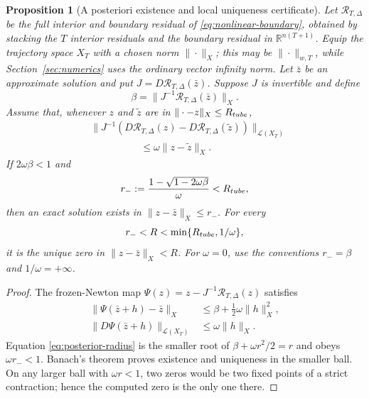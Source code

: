 \documentclass[twocolumn,nameyear,amsthm]{autart}
\newcommand{\R}{\mathbb R}
\numberwithin{equation}{section}
\newtheorem{proposition}[theorem]{Proposition}
\begin{document}
\begin{proposition}[A posteriori existence and local uniqueness certificate]\label{prop:posterior}
Let $\mathscr R_{T,\Delta}$ be the full interior and boundary residual of
\eqref{eq:nonlinear-boundary}, obtained by stacking the $T$ interior
residuals and the boundary residual in $\R^{n(T+1)}$.  Equip the trajectory
space $X_T$ with a chosen norm $\|\cdot\|_X$; this may be
$\|\cdot\|_{w,T}$, while Section~\ref{sec:numerics} uses the ordinary vector
infinity norm.  Let $\bar z$ be an approximate solution and put
$J=D\mathscr R_{T,\Delta}(\bar z)$.  Suppose $J$ is invertible and define
\begin{equation}\label{eq:posterior-beta}
 \beta=\|J^{-1}\mathscr R_{T,\Delta}(\bar z)\|_X.
\end{equation}
Assume that, whenever $z$ and $\tilde z$ are in
$\|\cdot-\bar z\|_X\le R_{\rm tube}$,
\begin{equation}\label{eq:posterior-omega}
\begin{aligned}
 &\|J^{-1}(D\mathscr R_{T,\Delta}(z)-
 D\mathscr R_{T,\Delta}(\tilde z))\|_{\mathcal L(X_T)}\\
 &\hspace{5em}\le\omega\|z-\tilde z\|_X.
\end{aligned}
\end{equation}
If $2\omega\beta<1$ and
\begin{equation}\label{eq:posterior-radius}
 r_-:=\frac{1-\sqrt{1-2\omega\beta}}{\omega}<R_{\rm tube},
\end{equation}
then an exact solution exists in
$\|z-\bar z\|_X\le r_-$.  For every
\[
 r_-<R<\min\{R_{\rm tube},1/\omega\},
\]
it is the unique zero in $\|z-\bar z\|_X<R$.  For $\omega=0$, use the
conventions $r_-=\beta$ and
$1/\omega=+\infty$.
\end{proposition}

\begin{proof}
The frozen-Newton map
$\Psi(z)=z-J^{-1}\mathscr R_{T,\Delta}(z)$ satisfies
\begin{align*}
 \|\Psi(\bar z+h)-\bar z\|_X
 &\le\beta+\tfrac12\omega\|h\|_X^2,\\
 \|D\Psi(\bar z+h)\|_{\mathcal L(X_T)}&\le\omega\|h\|_X .
\end{align*}
Equation \eqref{eq:posterior-radius} is the smaller root of
$\beta+\omega r^2/2=r$ and obeys $\omega r_-<1$.  Banach's theorem proves
existence and uniqueness in the smaller ball.  On any larger ball with
$\omega r<1$, two zeros would be two fixed points of a strict contraction;
hence the computed zero is the only one there.
\end{proof}
\end{document}
